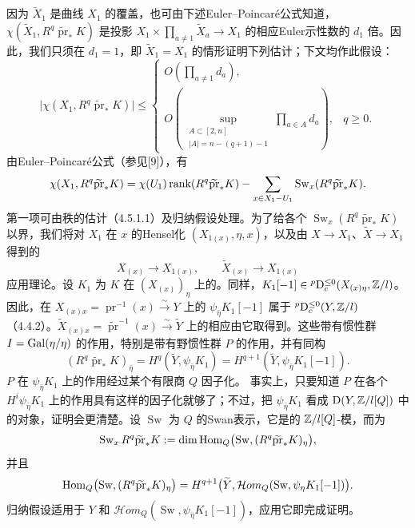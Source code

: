 因为 $\widetilde X_1$ 是曲线 $X_1$ 的覆盖，也可由下述Euler--Poincaré公式知道，$\chi(\widetilde X_1,R^q\widetilde{\operatorname{pr}}_*K)$ 是投影 $X_1\times\prod_{a\ne1}\widetilde X_a\to X_1$ 的相应Euler示性数的 $d_1$ 倍。因此，我们只须在 $d_1=1$，即 $\widetilde X_1=X_1$ 的情形证明下列估计；下文均作此假设：
\[
\bigl|\chi(X_1,R^q\widetilde{\operatorname{pr}}_*K)\bigr|\le
\begin{cases}
O\!\left(\displaystyle\prod_{a\ne1}d_a\right),\\[4pt]
O\!\left(\displaystyle\sup_{\substack{A\subset[2,n]\\ |A|=n-(q+1)-1}}\prod_{a\in A}d_a\right),&q\ge0.
\end{cases}
\]
由Euler--Poincaré公式（参见[9]），有
\[\chi(X_1,R^q\widetilde{\operatorname{pr}}_*K)=\chi(U_1)\operatorname{rank}(R^q\widetilde{\operatorname{pr}}_*K)-\sum_{x\in X_1-U_1}\operatorname{Sw}_x(R^q\widetilde{\operatorname{pr}}_*K).\]
第一项可由秩的估计（4.5.1.1）及归纳假设处理。为了给各个 $\operatorname{Sw}_x(R^q\widetilde{\operatorname{pr}}_*K)$ 以界，我们将对 $X_1$ 在 $x$ 的Hensel化 $(X_{1(x)},\eta,x)$，以及由 $X\to X_1$、$\widetilde X\to X_1$ 得到的
\[X_{(x)}\longrightarrow X_{1(x)},\qquad\widetilde X_{(x)}\longrightarrow X_{1(x)}\]
应用理论。设 $K_1$ 为 $K$ 在 $(X_{(x)})_\eta$ 上的。同样，$K_1[-1]\in{}^p\mathrm{D}_c^{\le0}(X_{(x)\eta},\mathbb Z/l)$。因此，在 $X_{(x)x}=\operatorname{pr}^{-1}(x)\xrightarrow\sim Y$ 上的 $\psi_{\bar\eta}K_1[-1]$ 属于 ${}^p\mathrm{D}_c^{\le0}(Y,\mathbb Z/l)$（4.4.2）。$\widetilde X_{(x)x}=\widetilde{\operatorname{pr}}^{-1}(x)\xrightarrow\sim\widetilde Y$ 上的相应由它取得到。这些带有惯性群 $I=\operatorname{Gal}(\relax\eta/\eta)$ 的作用，特别是带有野惯性群 $P$ 的作用，并有同构
\[(R^q\widetilde{\operatorname{pr}}_*K)_{\bar\eta}=H^q(\widetilde Y,\psi_{\bar\eta}K_1)=H^{q+1}(\widetilde Y,\psi_{\bar\eta}K_1[-1]).\]
$P$ 在 $\psi_{\bar\eta}K_1$ 上的作用经过某个有限商 $Q$ 因子化。
事实上，只要知道 $P$ 在各个 $H^i\psi_{\bar\eta}K_1$ 上的作用具有这样的因子化就够了；不过，把 $\psi_{\bar\eta}K_1$ 看成 $\mathrm{D}(Y,\mathbb Z/l[Q])$ 中的对象，证明会更清楚。设 $\operatorname{Sw}$ 为 $Q$ 的Swan表示，它是的 $\mathbb Z/l[Q]$-模，而为
\[\operatorname{Sw}_xR^q\widetilde{\operatorname{pr}}_*K:=\dim\operatorname{Hom}_Q\bigl(\operatorname{Sw},(R^q\widetilde{\operatorname{pr}}_*K)_{\relax\eta}\bigr),\]
并且
\[
\begin{aligned}
\operatorname{Hom}_Q\bigl(\operatorname{Sw},(R^q\widetilde{\operatorname{pr}}_*K)_{\relax\eta}\bigr)
=H^{q+1}\bigl(\widetilde Y,\mathcal Hom_Q(\operatorname{Sw},\psi_{\relax\eta}K_1[-1])\bigr).
\end{aligned}
\]
归纳假设适用于 $Y$ 和 $\mathcal Hom_Q(\operatorname{Sw},\psi_{\bar\eta}K_1[-1])$，应用它即完成证明。

